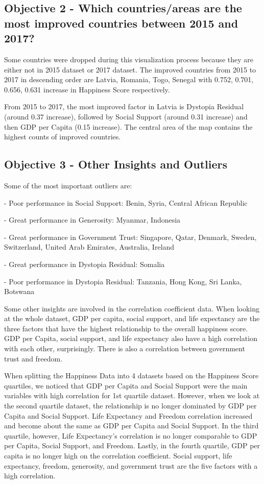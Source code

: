 \documentclass[11pt,twocolumn]{article}
\begin{document}
\subsection{Objective 2 - Which countries/areas are the most improved countries between 2015 and 2017?}
Some countries were dropped during this visualization process because they are either not in 2015 dataset or 2017 dataset. The improved countries from 2015 to 2017 in descending order are Latvia, Romania, Togo, Senegal with 0.752, 0.701, 0.656, 0.631 increase in Happiness Score respectively. 

From 2015 to 2017, the most improved factor in Latvia is Dystopia Residual (around 0.37 increase), followed by Social Support (around 0.31 increase) and then GDP per Capita (0.15 increase). The central area of the map contains the highest counts of improved countries.

\subsection{Objective 3 - Other Insights and Outliers}
Some of the most important outliers are:

- Poor performance in Social Support: Benin, Syria, Central African Republic

- Great performance in Generosity: Myanmar, Indonesia

- Great performance in Government Trust: Singapore, Qatar, Denmark, Sweden, Switzerland, United Arab Emirates, Australia, Ireland

- Great performance in Dystopia Residual: Somalia

- Poor performance in Dystopia Residual: Tanzania, Hong Kong, Sri Lanka, Botswana 

Some other insights are involved in the correlation coefficient data. When looking at the whole dataset, GDP per capita, social support, and life expectancy are the three factors that have the highest relationship to the overall happiness score. GDP per Capita, social support, and life expectancy also have a high correlation with each other, surprisingly. There is also a correlation between government trust and freedom.

When splitting the Happiness Data into 4 datasets based on the Happiness Score quartiles, we noticed that GDP per Capita and Social Support were the main variables with high correlation for 1st quartile dataset. However, when we look at the second quartile dataset, the relationship is no longer dominated by GDP per Capita and Social Support. Life Expectancy and Freedom correlation increased and become about the same as GDP per Capita and Social Support. In the third quartile, however, Life Expectancy's correlation is no longer comparable to GDP per Capita, Social Support, and Freedom. Lastly, in the fourth quartile, GDP per capita is no longer high on the correlation coefficient. Social support, life expectancy, freedom, generosity, and government trust are the five factors with a high correlation. 
\end{document}
